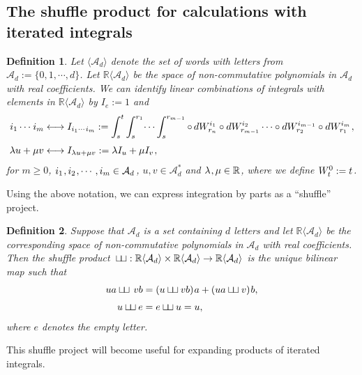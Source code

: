 \documentclass[sn-mathphys-num]{sn-jnl}%
\newtheorem{definition}{Definition}%
\newcommand{\R}{\mathbb{R}}
\newcommand{\m}{\hspace{0.25mm}}
\def\shuffle{\sqcup\mathchoice{\mkern-7mu}{\mkern-7mu}{\mkern-3.5mu}{\mkern-3.5mu}\sqcup\hspace{0.75mm}}
\def\textshuffle{\sqcup\mathchoice{\mkern-3mu}{\mkern-3mu}{\mkern-1mu}{\mkern-1mu}\sqcup}
\begin{document}
\subsection{The shuffle product for calculations with iterated integrals}\label{sect:shuffle}

\begin{definition}\label{def:shuffle_integral}
Let $\langle\mathcal{A}_d\rangle$ denote the set of words with letters from $\mathcal{A}_d := \{0,1,\cdots, d\}$. Let $\R\langle\mathcal{A}_d\rangle$ be the space of non-commutative polynomials in $\mathcal{A}_d$ with real coefficients. We can identify linear combinations of integrals with elements in $\R\langle\mathcal{A}_d\rangle$ by $I_e := 1$ and
\begin{align*}
i_1\cdots\m i_m & \longleftrightarrow I_{i_1\cdots\m i_m} :=
    \int_s^t \int_s^{r_1} \dots \int_s^{r_{m-1}} 
    \circ \, dW^{i_1}_{r_n} \circ dW^{i_2}_{r_{m-1}}\cdots \circ dW^{i_{m-1}}_{r_2} \circ dW^{i_m}_{r_1}\m,\\[3pt]
     \lambda u+\mu v & \longleftrightarrow I_{\lambda u + \mu v} := \lambda I_u + \mu I_v\m,
\end{align*}
for $m\geq 0$, $i_1\m, i_2\m,\cdots, i_m\in\mathcal{A}_d\m$, $u,v\in \mathcal{A}_d^\ast$ and $\lambda\m, \mu\in\R$, where we define $W_t^0 := t\m$.
\end{definition}\medbreak

Using the above notation, we can express integration by parts as a ``shuffle'' project.\medbreak

\begin{definition}\label{def:shuffle}
Suppose that $\mathcal{A}_d$ is a set containing $d$ letters and let $\R\langle\mathcal{A}_d\rangle$ be the corresponding space of non-commutative polynomials in $\mathcal{A}_d$ with real coefficients.
Then the shuffle product $\,\textshuffle :  \R\langle\mathcal{A}_d\rangle \times \R\langle\mathcal{A}_d\rangle \rightarrow \R\langle\mathcal{A}_d\rangle$ is the unique bilinear map such that
\begin{align*}
ua\shuffle\,vb & = (u\shuffle vb)\m a + (ua \shuffle v)\m b,\\[3pt]
u\shuffle e & = e \shuffle u = u,
\end{align*}
where $e$ denotes the empty letter.
\end{definition}\medbreak

This shuffle project will become useful for expanding products of iterated integrals.\medbreak
\end{document}

